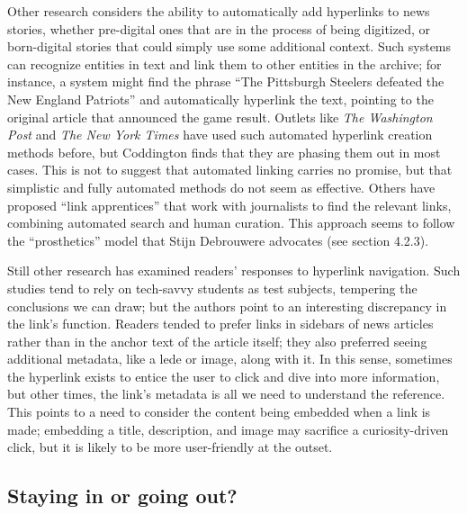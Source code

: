 Other research considers the ability to automatically add hyperlinks to news stories, whether pre-digital ones that are in the process of being digitized, or born-digital stories that could simply use some additional context.\autocite{arapakis_automatically_2014} Such systems can recognize entities in text and link them to other entities in the archive; for instance, a system might find the phrase ``The Pittsburgh Steelers defeated the New England Patriots'' and automatically hyperlink the text, pointing to the original article that announced the game result. Outlets like \emph{The Washington Post} and \emph{The New York Times} have used such automated hyperlink creation methods before, but Coddington finds that they are phasing them out in most cases.\autocite[148]{coddington_normalizing_2014} This is not to suggest that automated linking carries no promise, but that simplistic and fully automated methods do not seem as effective. Others have proposed ``link apprentices'' that work with journalists to find the relevant links, combining automated search and human curation.\autocite{bernstein_apprentice_1990} This approach seems to follow the ``prosthetics'' model that Stijn Debrouwere advocates (see section 4.2.3).

Still other research has examined readers' responses to hyperlink navigation. Such studies tend to rely on tech-savvy students as test subjects, tempering the conclusions we can draw; but the authors point to an interesting discrepancy in the link's function. Readers tended to prefer links in sidebars of news articles rather than in the anchor text of the article itself; they also preferred seeing additional metadata, like a lede or image, along with it.\autocite[See][]{eveland_user_2001,tremayne_manipulating_2008} In this sense, sometimes the hyperlink exists to entice the user to click and dive into more information, but other times, the link's metadata is all we need to understand the reference. This points to a need to consider the content being embedded when a link is made; embedding a title, description, and image may sacrifice a curiosity-driven click, but it is likely to be more user-friendly at the outset.

\subsection{Staying in or going out?}

